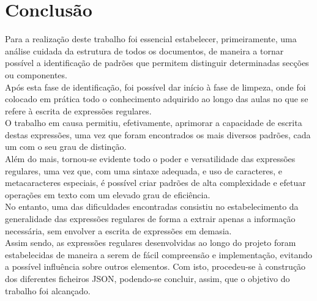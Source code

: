 \section{Conclusão}
Para a realização deste trabalho foi essencial estabelecer, primeiramente, uma análise cuidada da estrutura de todos os documentos, de maneira a tornar possível a identificação de padrões que permitem distinguir determinadas secções ou componentes.\\
Após esta fase de identificação, foi possível dar início à fase de limpeza, onde foi colocado em prática todo o conhecimento adquirido ao longo das aulas no que se refere à escrita de expressões regulares.\\

O trabalho em causa permitiu, efetivamente, aprimorar a capacidade de escrita destas expressões, uma vez que foram encontrados os mais diversos padrões, cada um com o seu grau de distinção.\\
Além do mais, tornou-se evidente todo o poder e versatilidade das expressões regulares, uma vez que, com uma sintaxe adequada, e uso de caracteres, e metacaracteres especiais, é possível criar padrões de alta complexidade e efetuar operações em texto com um elevado grau de eficiência.\\

No entanto, uma das dificuldades encontradas consistiu no estabelecimento da generalidade das expressões regulares de forma a extrair apenas a informação necessária, sem envolver a escrita de expressões em demasia. \\

Assim sendo, as expressões regulares desenvolvidas ao longo do projeto foram estabelecidas de maneira a serem de fácil compreensão e implementação, evitando a possível influência sobre outros elementos. Com isto, procedeu-se à construção dos diferentes ficheiros JSON, podendo-se concluir, assim, que o objetivo do trabalho foi alcançado.


